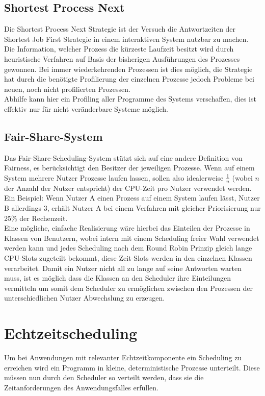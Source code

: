 \subsection{Shortest Process Next}
Die Shortest Process Next Strategie ist der Versuch die Antwortzeiten der Shortest Job First Strategie in 
einem interaktiven System nutzbar zu machen. Die Information, welcher Prozess die kürzeste Laufzeit besitzt 
wird durch heuristische Verfahren auf Basis der bisherigen Ausführungen des Prozesses gewonnen. Bei immer 
wiederkehrenden Prozessen ist dies möglich, die Strategie hat durch die benötigte Profilierung der 
einzelnen Prozesse jedoch Probleme bei neuen, noch nicht profilierten Prozessen. \\
Abhilfe kann hier ein Profiling aller Programme des Systems verschaffen, dies ist effektiv nur für nicht 
veränderbare Systeme möglich. 

\subsection{Fair-Share-System}
Das Fair-Share-Scheduling-System stützt sich auf eine andere Definition von Fairness, es berücksichtigt den 
Besitzer der jeweiligen Prozesse. Wenn auf einem System mehrere Nutzer Prozesse laufen lassen, sollen also 
idealerweise \(\frac{1}{n}\) (wobei \(n\) der Anzahl der Nutzer entspricht) der CPU-Zeit pro Nutzer 
verwendet werden. \\
Ein Beispiel: Wenn Nutzer A einen Prozess auf einem System laufen lässt, Nutzer B allerdings 3, erhält 
Nutzer A bei einem Verfahren mit gleicher Priorisierung nur 25\% der Rechenzeit. \\
Eine mögliche, einfache Realisierung wäre hierbei das Einteilen der Prozesse in Klassen von Benutzern, 
wobei intern mit einem Scheduling freier Wahl verwendet werden kann und jedes Scheduling nach dem Round 
Robin Prinzip gleich lange CPU-Slots zugeteilt bekommt, diese Zeit-Slots werden in den einzelnen Klassen 
verarbeitet. Damit ein Nutzer nicht all zu lange auf seine Antworten warten muss, ist es möglich dass die 
Klassen an den Scheduler ihre Einteilungen vermitteln um somit dem Scheduler zu ermöglichen zwischen den 
Prozessen der unterschiedlichen Nutzer Abwechslung zu erzeugen.
\\

\section{Echtzeitscheduling}
Um bei Anwendungen mit relevanter Echtzeitkomponente ein Scheduling zu erreichen wird ein Programm in 
kleine, deterministische Prozesse unterteilt. Diese müssen nun durch den Scheduler so verteilt werden, dass 
sie die Zeitanforderungen des Anwendungsfalles erfüllen.

